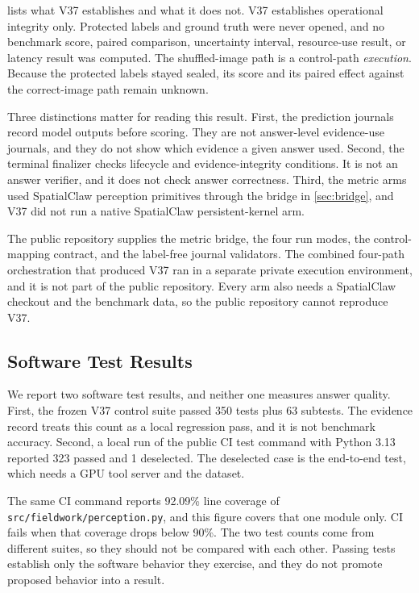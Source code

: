 \documentclass{article}
\begin{document}
 lists what V37 establishes and what it does not. V37 establishes operational integrity only. Protected labels and ground truth were never opened, and no benchmark score, paired comparison, uncertainty interval, resource-use result, or latency result was computed. The shuffled-image path is a control-path \emph{execution}. Because the protected labels stayed sealed, its score and its paired effect against the correct-image path remain unknown.

Three distinctions matter for reading this result. First, the prediction journals record model outputs before scoring. They are not answer-level evidence-use journals, and they do not show which evidence a given answer used. Second, the terminal finalizer checks lifecycle and evidence-integrity conditions. It is not an answer verifier, and it does not check answer correctness. Third, the metric arms used SpatialClaw perception primitives through the bridge in \cref{sec:bridge}, and V37 did not run a native SpatialClaw persistent-kernel arm.

The public repository supplies the metric bridge, the four run modes, the control-mapping contract, and the label-free journal validators. The combined four-path orchestration that produced V37 ran in a separate private execution environment, and it is not part of the public repository. Every arm also needs a SpatialClaw checkout and the benchmark data, so the public repository cannot reproduce V37.

\subsection{Software Test Results}
\label{sec:tests}

We report two software test results, and neither one measures answer quality. First, the frozen V37 control suite passed 350 tests plus 63 subtests. The evidence record treats this count as a local regression pass, and it is not benchmark accuracy. Second, a local run of the public CI test command with Python 3.13 reported 323 passed and 1 deselected. The deselected case is the end-to-end test, which needs a GPU tool server and the dataset.

The same CI command reports 92.09\% line coverage of \texttt{src/fieldwork/perception.py}, and this figure covers that one module only. CI fails when that coverage drops below 90\%. The two test counts come from different suites, so they should not be compared with each other. Passing tests establish only the software behavior they exercise, and they do not promote proposed behavior into a result.
\end{document}
